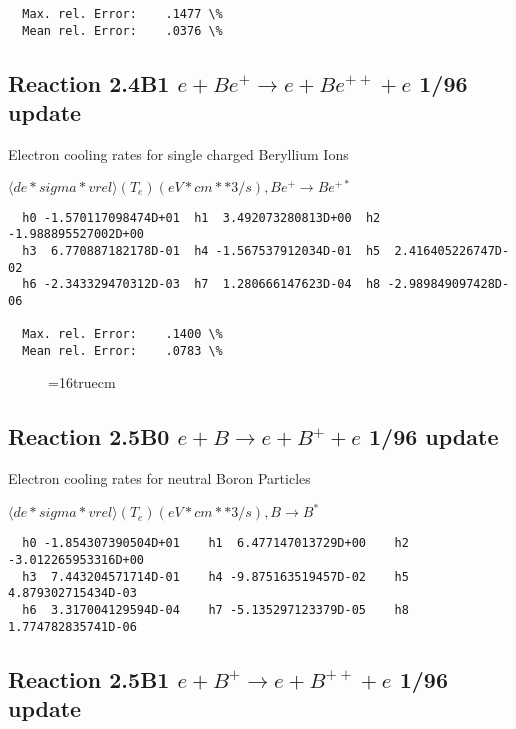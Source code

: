 \documentclass[12pt,dvipdfmx]{article}
\begin{document}
{\begin{small}
\begin{verbatim}
  Max. rel. Error:    .1477 \%
  Mean rel. Error:    .0376 \%

\end{verbatim}\end{small}


\subsection{
Reaction 2.4B1 $e + Be^+ \rightarrow e + Be^{++} + e $ 1/96 update
}

  Electron cooling rates for single
  charged Beryllium Ions

 $ \langle de*sigma*vrel \rangle(T_e)  (eV*cm**3/s), Be^+ \rightarrow Be^{+*} $

\begin{small}\begin{verbatim}
  h0 -1.570117098474D+01  h1  3.492073280813D+00  h2 -1.988895527002D+00
  h3  6.770887182178D-01  h4 -1.567537912034D-01  h5  2.416405226747D-02
  h6 -2.343329470312D-03  h7  1.280666147623D-04  h8 -2.989849097428D-06

  Max. rel. Error:    .1400 \%
  Mean rel. Error:    .0783 \%

\end{verbatim}\end{small}

\begin{figure} \label{2.4Bl}
\epsfxsize=16truecm
\end{figure}
\newpage

\subsection{
Reaction 2.5B0 $e + B \rightarrow e + B^+ + e $ 1/96 update
}

 Electron cooling rates for neutral
 Boron Particles

$  \langle de*sigma*vrel \rangle(T_e)  (eV*cm**3/s), B   \rightarrow B^* $


\begin{small}\begin{verbatim}
  h0 -1.854307390504D+01    h1  6.477147013729D+00    h2 -3.012265953316D+00
  h3  7.443204571714D-01    h4 -9.875163519457D-02    h5  4.879302715434D-03
  h6  3.317004129594D-04    h7 -5.135297123379D-05    h8  1.774782835741D-06
\end{verbatim}\end{small}

\subsection{
Reaction 2.5B1 $e + B^+ \rightarrow e + B^{++} + e $ 1/96 update
}

}
\end{document}
